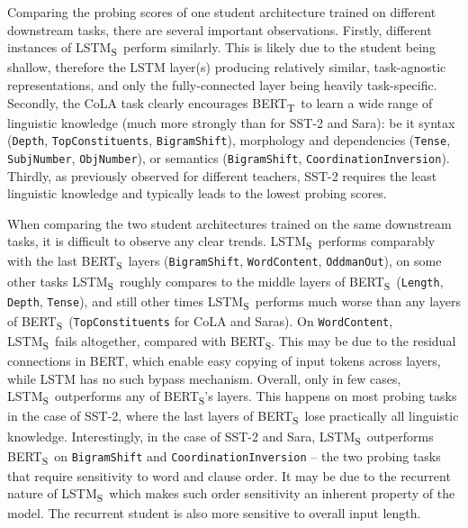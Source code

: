 \documentclass[bsc,frontabs,twoside,singlespacing,parskip,deptreport]{infthesis}
\def\BERTT{BERT\textsubscript{T}}
\def\BERTS{BERT\textsubscript{S}}
\def\LSTMS{LSTM\textsubscript{S}}
\begin{document}
{{{      %
      Comparing the probing scores of one student architecture trained on different downstream tasks, there are several important observations.
      Firstly, different instances of \LSTMS~perform similarly. This is likely due to the student being shallow, therefore the LSTM layer(s) producing relatively similar, task-agnostic representations, and only the fully-connected layer being heavily task-specific.
      Secondly, the CoLA task clearly encourages \BERTT~to learn a wide range of linguistic knowledge (much more strongly than for SST-2 and Sara): be it syntax (\verb|Depth|, \verb|TopConstituents|, \verb|BigramShift|), morphology and dependencies (\verb|Tense|, \verb|SubjNumber|, \verb|ObjNumber|), or semantics (\verb|BigramShift|, \verb|CoordinationInversion|).
      Thirdly, as previously observed for different teachers, SST-2 requires the least linguistic knowledge and typically leads to the lowest probing scores.

      When comparing the two student architectures trained on the same downstream tasks, it is difficult to observe any clear trends.
      \LSTMS~performs comparably with the last \BERTS~layers (\verb|BigramShift|, \verb|WordContent|, \verb|OddmanOut|), on some other tasks \LSTMS~roughly compares to the middle layers of \BERTS~(\verb|Length|, \verb|Depth|, \verb|Tense|), and still other times \LSTMS~performs much worse than any layers of \BERTS~(\verb|TopConstituents| for CoLA and Saras).
      On \verb|WordContent|, \LSTMS~fails altogether, compared with \BERTS. This may be due to the residual connections in BERT, which enable easy copying of input tokens across layers, while LSTM has no such bypass mechanism.
      Overall, only in few cases, \LSTMS~outperforms any of \BERTS's layers. This happens on most probing tasks in the case of SST-2, where the last layers of \BERTS~lose practically all linguistic knowledge.
      Interestingly, in the case of SST-2 and Sara, \LSTMS~outperforms \BERTS~on \verb|BigramShift| and \verb|CoordinationInversion| -- the two probing tasks that require sensitivity to word and clause order. It may be due to the recurrent nature of \LSTMS~which makes such order sensitivity an inherent property of the model. The recurrent student is also more sensitive to overall input length.

}}}
\end{document}
